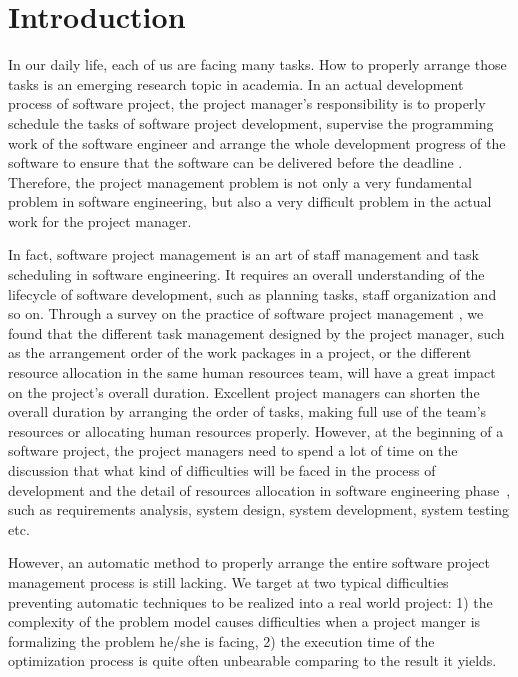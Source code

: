 
\section{Introduction}

%
In our daily life, each of us are facing many tasks. How to properly arrange
those tasks is an emerging research topic in academia. In an actual
development process of software project, the project manager's responsibility is
to properly schedule the tasks of software project development, supervise the
programming work of the software engineer and arrange the whole development
progress of the software to ensure that the software can be delivered before the
deadline \cite{stellman}. Therefore, the project management problem is not only
a very fundamental problem in software engineering, but also a very difficult
problem in the actual work for the project manager.

In fact, software project management is an art of staff management and task scheduling in software engineering. It requires an overall understanding of the lifecycle of software development, such as planning tasks, staff organization and so on. 
Through a survey on the practice of software project management \cite{chang,alba,ren,penta}, we found that the different task management designed by the project manager, such as  the arrangement order of the work packages in a project, or the different  resource allocation in the same human resources team, will have a great  impact on the project's overall duration.
Excellent project managers can  shorten the overall duration by arranging the order of tasks, making full use  of the team's resources or allocating human resources properly. However, at the beginning of a software project, the project managers need to spend a lot  of time on the discussion that what kind of difficulties will be faced in the process of development and the detail of resources allocation in  software engineering phase~\cite{pentico}, such as requirements analysis, system design, system development, system testing etc. 

However, an automatic method to properly arrange the entire software project management process is still lacking. 
We target at two typical difficulties preventing automatic techniques to be realized into a real world project: 
1) the complexity of the problem model causes difficulties when a project manger is formalizing the problem he\slash she is facing, 
2) the execution time of the optimization process is quite often unbearable comparing to the result it yields. 

